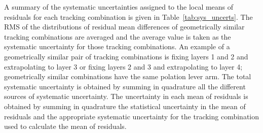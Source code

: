 



A summary of the systematic uncertainties assigned to the local means of residuals for each tracking combination is given in Table~\ref{tab:sys_uncerts}. The RMS of the distributions of residual mean differences of geometrically similar tracking combinations are averaged and the average value is taken as the systematic uncertainty for those tracking combinations. An example of a geometrically similar pair of tracking combinations is fixing layers 1 and 2 and extrapolating to layer 3 or fixing layers 2 and 3 and extrapolating to layer 4; geometrically similar combinations have the same polation lever arm. The total systematic uncertainty is obtained by summing in quadrature all the different sources of systematic uncertainty. The uncertainty in each mean of residuals is obtained by summing in quadrature the statistical uncertainty in the mean of residuals and the appropriate systematic uncertainty for the tracking combination used to calculate the mean of residuals.

